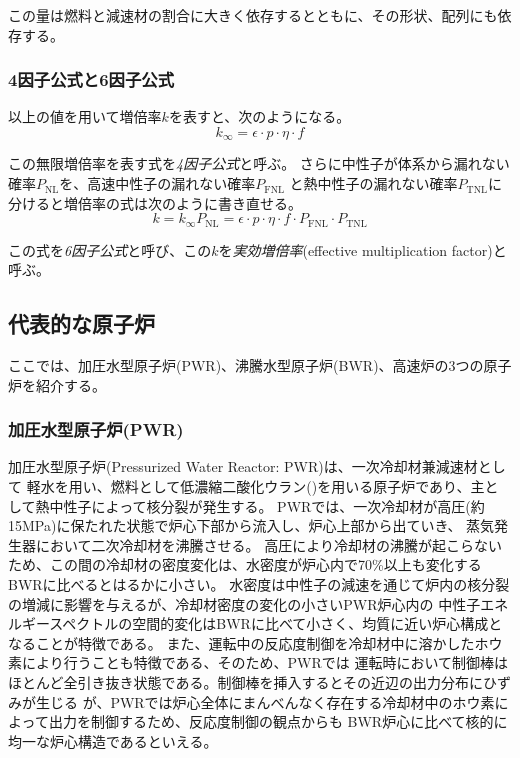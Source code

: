 この量は燃料と減速材の割合に大きく依存するとともに、その形状、配列にも依存する。

\subsubsection{4因子公式と6因子公式}
以上の値を用いて増倍率$k$を表すと、次のようになる。
\begin{equation}
  k_\infty = \epsilon \cdot p \cdot \eta \cdot f
\end{equation}

この無限増倍率を表す式を\emph{4因子公式}と呼ぶ。
さらに中性子が体系から漏れない確率$P_\text{NL}$を、高速中性子の漏れない確率$P_\text{FNL}$
と熱中性子の漏れない確率$P_\text{TNL}$に分けると増倍率の式は次のように書き直せる。
\begin{equation}
  k = k_\infty P_\text{NL} =\epsilon \cdot p \cdot \eta \cdot f
\cdot P_\text{FNL} \cdot P_\text{TNL}
\end{equation}

この式を\emph{6因子公式}と呼び、この$k$を\emph{実効増倍率}(effective multiplication factor)と呼ぶ。

\subsection{代表的な原子炉}
ここでは、加圧水型原子炉(PWR)、沸騰水型原子炉(BWR)、高速炉の3つの原子炉を紹介する。
\subsubsection{加圧水型原子炉(PWR)}
加圧水型原子炉(Pressurized Water Reactor: PWR)は、一次冷却材兼減速材として
軽水を用い、燃料として低濃縮二酸化ウラン()を用いる原子炉であり、主として熱中性子によって核分裂が発生する。
PWRでは、一次冷却材が高圧(約15MPa)に保たれた状態で炉心下部から流入し、炉心上部から出ていき、
蒸気発生器において二次冷却材を沸騰させる。
高圧により冷却材の沸騰が起こらないため、この間の冷却材の密度変化は、水密度が炉心内で70\%以上も変化するBWRに比べるとはるかに小さい。
水密度は中性子の減速を通じて炉内の核分裂の増減に影響を与えるが、冷却材密度の変化の小さいPWR炉心内の
中性子エネルギースペクトルの空間的変化はBWRに比べて小さく、均質に近い炉心構成となることが特徴である。
また、運転中の反応度制御を冷却材中に溶かしたホウ素により行うことも特徴である、そのため、PWRでは
運転時において制御棒はほとんど全引き抜き状態である。制御棒を挿入するとその近辺の出力分布にひずみが生じる
が、PWRでは炉心全体にまんべんなく存在する冷却材中のホウ素によって出力を制御するため、反応度制御の観点からも
BWR炉心に比べて核的に均一な炉心構造であるといえる。

